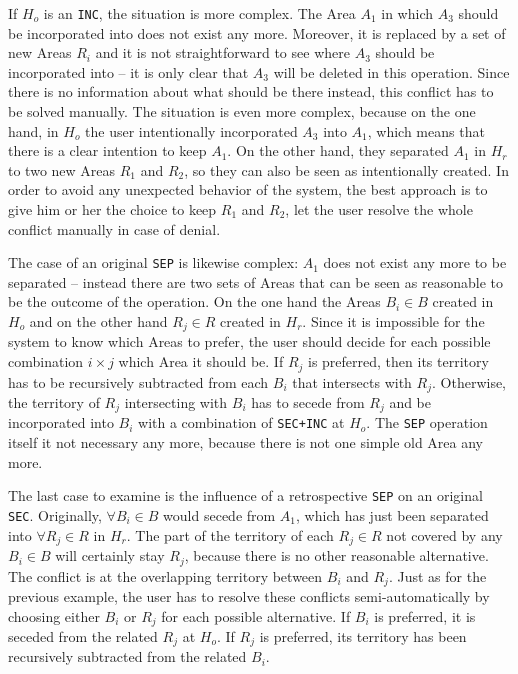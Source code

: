 If $H_o$ is an \texttt{INC}, the situation is more complex. The Area $A_1$ in which $A_3$ should be incorporated into does not exist any more. Moreover, it is replaced by a set of new Areas $R_i$ and it is not straightforward to see where $A_3$ should be incorporated into -- it is only clear that $A_3$ will be deleted in this operation. Since there is no information about what should be there instead, this conflict has to be solved manually. The situation is even more complex, because on the one hand, in $H_o$ the user intentionally incorporated $A_3$ into $A_1$, which means that there is a clear intention to keep $A_1$. On the other hand, they separated $A_1$ in $H_r$ to two new Areas $R_1$ and $R_2$, so they can also be seen as intentionally created. In order to avoid any unexpected behavior of the system, the best approach is to give him or her the choice to keep $R_1$ and $R_2$, let the user resolve the whole conflict manually in case of denial.

The case of an original \texttt{SEP} is likewise complex: $A_1$ does not exist any more to be separated -- instead there are two sets of Areas that can be seen as reasonable to be the outcome of the operation. On the one hand the Areas $B_i \in B$ created in $H_o$ and on the other hand $R_j \in R$ created in $H_r$. Since it is impossible for the system to know which Areas to prefer, the user should decide for each possible combination $i \times j$ which Area it should be. If $R_j$ is preferred, then its territory has to be recursively subtracted from each $B_i$ that intersects with $R_j$. Otherwise, the territory of $R_j$ intersecting with $B_i$ has to secede from $R_j$ and be incorporated into $B_i$ with a combination of \texttt{SEC+INC} at $H_o$. The \texttt{SEP} operation itself it not necessary any more, because there is not one simple old Area any more.

The last case to examine is the influence of a retrospective \texttt{SEP} on an original \texttt{SEC}. Originally, $\forall B_i \in B$ would secede from $A_1$, which has just been separated into $\forall R_j \in R$ in $H_r$. The part of the territory of each $R_j \in R$ not covered by any $B_i \in B$ will certainly stay $R_j$, because there is no other reasonable alternative. The conflict is at the overlapping territory between $B_i$ and $R_j$. Just as for the previous example, the user has to resolve these conflicts semi-automatically by choosing either $B_i$ or $R_j$ for each possible alternative. If $B_i$ is preferred, it is seceded from the related $R_j$ at $H_o$. If $R_j$ is preferred, its territory has been recursively subtracted from the related $B_i$.

